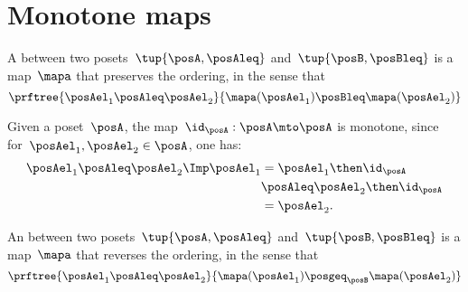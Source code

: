 \section{Monotone maps}\label{sec:monotonicity-monotone-maps}


\begin{definition}
  \label{def:monotone}
  A \emph{} between two posets~$\tup{\posA, \posAleq}$ and~$\tup{\posB, \posBleq}$ is a map~$\mapa$ that preserves the ordering, in the sense that
  \begin{equation}
    \prftree{\posAel_1 \posAleq \posAel_2 }{\mapa(\posAel_1) \posBleq \mapa(\posAel_2)}
  \end{equation}
\end{definition}
\begin{remark}
 Given a poset~$\posA$, the map~$\id_\posA: \posA \mto \posA$ is monotone, since for~$\posAel_1,\posAel_2\in \posA$, one has:
  \begin{equation*}
    \begin{aligned}
      \posAel_1\posAleq \posAel_2 \Imp \posAel_1&=\posAel_1\then \id_\posA\\
      &\posAleq \posAel_2\then \id_\posA \\
      &= \posAel_2.
    \end{aligned}
  \end{equation*}
\end{remark}


\begin{definition}
  \label{def:antitone}
  An \emph{} between two posets~$\tup{\posA, \posAleq}$ and~$\tup{\posB, \posBleq}$ is a map~$\mapa$ that reverses the ordering, in the sense that
  \begin{equation}
    \prftree{\posAel_1 \posAleq \posAel_2}{\mapa(\posAel_1) \posgeq_\posB \mapa(\posAel_2)}
  \end{equation}
\end{definition}


